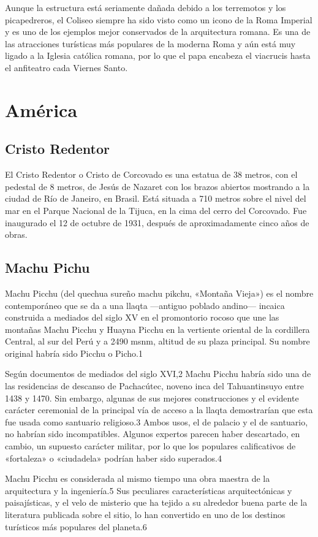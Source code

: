\documentclass[a4paper,12pt]{article}
\begin{document}
Aunque la estructura está seriamente dañada debido a los terremotos y los picapedreros, el Coliseo siempre ha sido visto como un icono de la Roma Imperial y es uno de los ejemplos mejor conservados de la arquitectura romana. Es una de las atracciones turísticas más populares de la moderna Roma y aún está muy ligado a la Iglesia católica romana, por lo que el papa encabeza el viacrucis hasta el anfiteatro cada Viernes Santo.
\section{América}
 \subsection{Cristo Redentor}
 El Cristo Redentor o Cristo de Corcovado es una estatua de 38 metros, con el pedestal de 8 metros, de Jesús de Nazaret con los brazos abiertos mostrando a la ciudad de Río de Janeiro, en Brasil. Está situada a 710 metros sobre el nivel del mar en el Parque Nacional de la Tijuca, en la cima del cerro del Corcovado. Fue inaugurado el 12 de octubre de 1931, después de aproximadamente cinco años de obras.
 \subsection{Machu Pichu}
Machu Picchu (del quechua sureño machu pikchu, «Montaña Vieja») es el nombre contemporáneo que se da a una llaqta —antiguo poblado andino— incaica construida a mediados del siglo XV en el promontorio rocoso que une las montañas Machu Picchu y Huayna Picchu en la vertiente oriental de la cordillera Central, al sur del Perú y a 2490 msnm, altitud de su plaza principal. Su nombre original habría sido Picchu o Picho.1

Según documentos de mediados del siglo XVI,2 Machu Picchu habría sido una de las residencias de descanso de Pachacútec, noveno inca del Tahuantinsuyo entre 1438 y 1470. Sin embargo, algunas de sus mejores construcciones y el evidente carácter ceremonial de la principal vía de acceso a la llaqta demostrarían que esta fue usada como santuario religioso.3 Ambos usos, el de palacio y el de santuario, no habrían sido incompatibles. Algunos expertos parecen haber descartado, en cambio, un supuesto carácter militar, por lo que los populares calificativos de «fortaleza» o «ciudadela» podrían haber sido superados.4

Machu Picchu es considerada al mismo tiempo una obra maestra de la arquitectura y la ingeniería.5 Sus peculiares características arquitectónicas y paisajísticas, y el velo de misterio que ha tejido a su alrededor buena parte de la literatura publicada sobre el sitio, lo han convertido en uno de los destinos turísticos más populares del planeta.6
\end{document}
